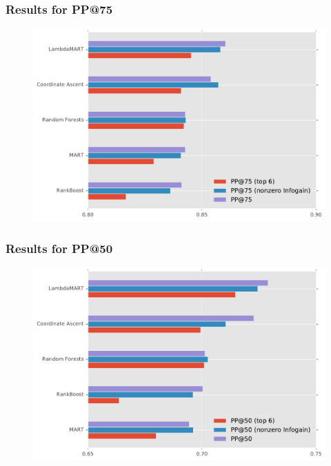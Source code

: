 \begin{frame}
  \frametitle{Results for PP@75}
  \begin{figure}[tbph]
    \centering
    \includegraphics[width=\linewidth]{images/results_pp75}
  \end{figure}
\end{frame}

\begin{frame}
  \frametitle{Results for PP@50}
  \begin{figure}[tbph]
    \centering
    \includegraphics[width=\linewidth]{images/results_pp50}
  \end{figure}
\end{frame}

